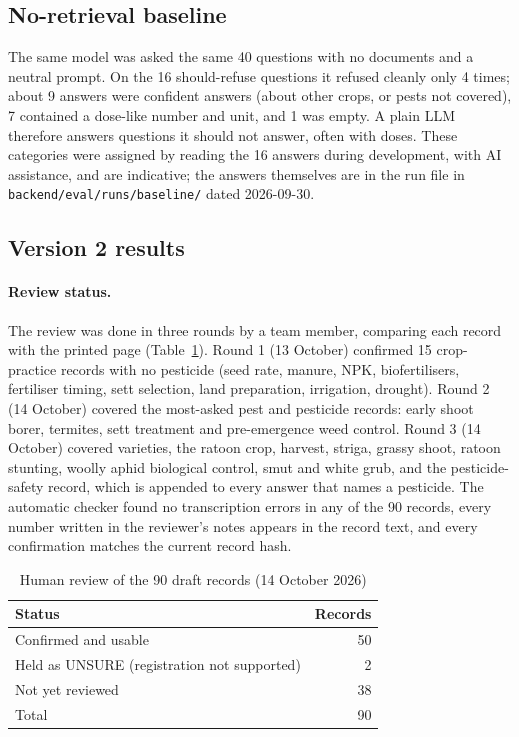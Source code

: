 \subsection{No-retrieval baseline}
The same model was asked the same 40 questions with no documents and a neutral prompt.
On the 16 should-refuse questions it refused cleanly only 4 times; about 9 answers were
confident answers (about other crops, or pests not covered), 7 contained a dose-like
number and unit, and 1 was empty. A plain LLM therefore answers questions it should not
answer, often with doses. These categories were assigned by reading the 16 answers during
development, with AI assistance, and are indicative; the answers themselves are in the run
file in \texttt{backend/eval/runs/baseline/} dated 2026-09-30.

\subsection{Version 2 results}
\paragraph{Review status.} The review was done in three rounds by a team member, comparing
each record with the printed page (Table~\ref{tab:review}). Round 1 (13 October) confirmed
15 crop-practice records with no pesticide (seed rate, manure, NPK, biofertilisers,
fertiliser timing, sett selection, land preparation, irrigation, drought). Round 2
(14 October) covered the most-asked pest and pesticide records: early shoot borer, termites,
sett treatment and pre-emergence weed control. Round 3 (14 October) covered varieties, the
ratoon crop, harvest, striga, grassy shoot, ratoon stunting, woolly aphid biological control,
smut and white grub, and the pesticide-safety record, which is appended to every answer that
names a pesticide. The automatic checker found no transcription errors in any of the 90
records, every number written in the reviewer's notes appears in the record text, and every
confirmation matches the current record hash.

\begin{table}[h]
\centering
\caption{Human review of the 90 draft records (14 October 2026)}
\label{tab:review}
\begin{tabular}{lr}
\toprule
Status & Records\\
\midrule
Confirmed and usable & 50\\
Held as UNSURE (registration not supported) & 2\\
Not yet reviewed & 38\\
\midrule
Total & 90\\
\bottomrule
\end{tabular}
\end{table}

